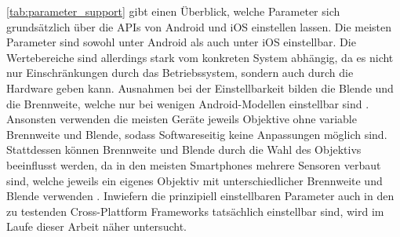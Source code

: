 \autoref{tab:parameter_support} gibt einen Überblick, welche Parameter sich grundsätzlich über die \acp{API} von Android und iOS einstellen lassen.
Die meisten Parameter sind sowohl unter Android als auch unter iOS einstellbar.
Die Wertebereiche sind allerdings stark vom konkreten System abhängig, da es nicht nur Einschränkungen durch das Betriebssystem, sondern auch durch die Hardware geben kann.
Ausnahmen bei der Einstellbarkeit bilden die Blende und die Brennweite, welche nur bei wenigen Android-Modellen einstellbar sind \cite{Sony_VariableZoom,VariableAperture_Smartphones}.
Ansonsten verwenden die meisten Geräte jeweils Objektive ohne variable Brennweite und Blende, sodass Softwareseitig keine Anpassungen möglich sind.
Stattdessen können Brennweite und Blende durch die Wahl des Objektivs beeinflusst werden, da in den meisten Smartphones mehrere Sensoren verbaut sind, welche jeweils ein eigenes Objektiv mit unterschiedlicher Brennweite und Blende verwenden \cite[S. 499ff.]{Schmidt_Videotechnik}.
Inwiefern die prinzipiell einstellbaren Parameter auch in den zu testenden Cross-Plattform Frameworks tatsächlich einstellbar sind, wird im Laufe dieser Arbeit näher untersucht.

